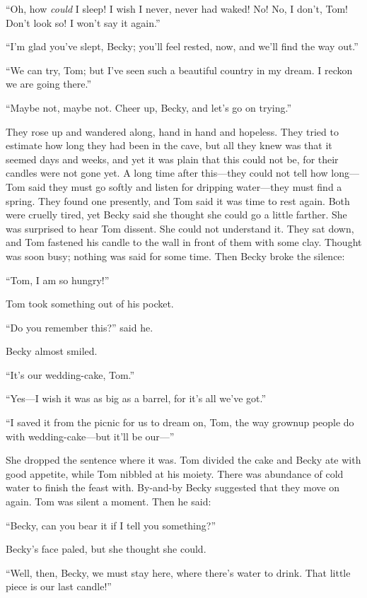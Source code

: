 \documentclass{book}
\begin{document}
“Oh, how \emph{could} I sleep! I wish I never, never had waked! No! No, I don’t, Tom! Don’t look so! I won’t say it again.”

“I’m glad you’ve slept, Becky; you’ll feel rested, now, and we’ll find the way out.”

“We can try, Tom; but I’ve seen such a beautiful country in my dream. I reckon we are going there.”

“Maybe not, maybe not. Cheer up, Becky, and let’s go on trying.”

They rose up and wandered along, hand in hand and hopeless. They tried to estimate how long they had been in the cave, but all they knew was that it seemed days and weeks, and yet it was plain that this could not be, for their candles were not gone yet. A long time after this—they could not tell how long—Tom said they must go softly and listen for dripping water—they must find a spring. They found one presently, and Tom said it was time to rest again. Both were cruelly tired, yet Becky said she thought she could go a little farther. She was surprised to hear Tom dissent. She could not understand it. They sat down, and Tom fastened his candle to the wall in front of them with some clay. Thought was soon busy; nothing was said for some time. Then Becky broke the silence:

“Tom, I am so hungry!”

Tom took something out of his pocket.

“Do you remember this?” said he.

Becky almost smiled.

“It’s our wedding-cake, Tom.”

“Yes—I wish it was as big as a barrel, for it’s all we’ve got.”

“I saved it from the picnic for us to dream on, Tom, the way grownup people do with wedding-cake—but it’ll be our—”

She dropped the sentence where it was. Tom divided the cake and Becky ate with good appetite, while Tom nibbled at his moiety. There was abundance of cold water to finish the feast with. By-and-by Becky suggested that they move on again. Tom was silent a moment. Then he said:

“Becky, can you bear it if I tell you something?”

Becky’s face paled, but she thought she could.

“Well, then, Becky, we must stay here, where there’s water to drink. That little piece is our last candle!”
\end{document}
